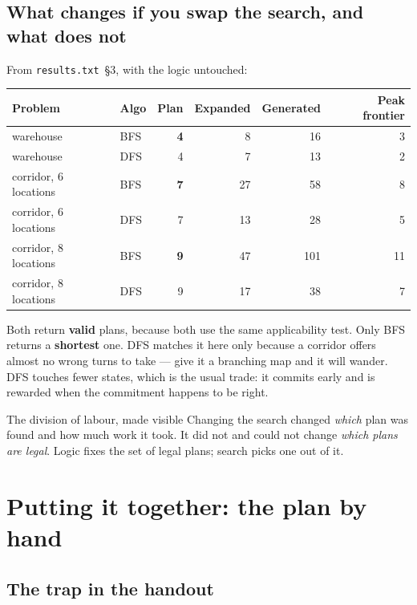 \documentclass[11pt,a4paper]{article}
\begin{document}
\subsection{What changes if you swap the search, and what does not}

From \texttt{results.txt}~\S3, with the logic untouched:

\begin{center}
\small
\begin{tabular}{@{}llrrrr@{}}
\toprule
\textbf{Problem} & \textbf{Algo} & \textbf{Plan} & \textbf{Expanded} & \textbf{Generated} & \textbf{Peak frontier} \\
\midrule
warehouse            & BFS & \textbf{4} & 8  & 16  & 3 \\
warehouse            & DFS & 4          & 7  & 13  & 2 \\
corridor, 6 locations & BFS & \textbf{7} & 27 & 58  & 8 \\
corridor, 6 locations & DFS & 7          & 13 & 28  & 5 \\
corridor, 8 locations & BFS & \textbf{9} & 47 & 101 & 11 \\
corridor, 8 locations & DFS & 9          & 17 & 38  & 7 \\
\bottomrule
\end{tabular}
\end{center}

Both return \textbf{valid} plans, because both use the same applicability test.
Only BFS returns a \textbf{shortest} one. DFS matches it here only because a
corridor offers almost no wrong turns to take --- give it a branching map and it
will wander. DFS touches fewer states, which is the usual trade: it commits
early and is rewarded when the commitment happens to be right.

\begin{okbox}{The division of labour, made visible}
Changing the search changed \emph{which} plan was found and how much work it
took. It did not and could not change \emph{which plans are legal}. Logic fixes
the set of legal plans; search picks one out of it.
\end{okbox}

\section{Putting it together: the plan by hand}

\subsection{The trap in the handout}
\end{document}
